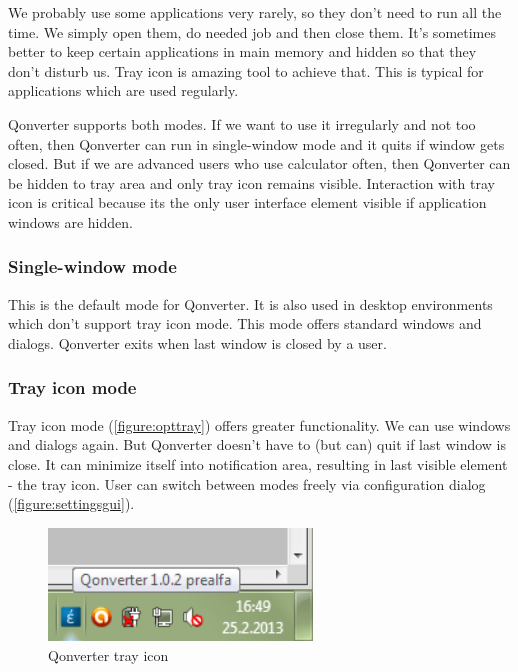 We probably use some applications very rarely, so they don't need to run all the time. We simply open them, do needed job and then close them. It's sometimes better to keep certain applications in main memory and hidden so that they don't disturb us. Tray icon is amazing tool to achieve that. This is typical for applications which are used regularly.

Qonverter supports both modes. If we want to use it irregularly and not too often, then Qonverter can run in single-window mode and it quits if window gets closed. But if we are advanced users who use calculator often, then Qonverter can be hidden to tray area and only tray icon remains visible. Interaction with tray icon is critical because its the only user interface element visible if application windows are hidden.

\subsubsection{Single-window mode}
This is the default mode for Qonverter. It is also used in desktop environments which don't support tray icon mode. This mode offers standard windows and dialogs. Qonverter exits when last window is closed by a user.

\subsubsection{Tray icon mode}
Tray icon mode (\autoref{figure:opttray}) offers greater functionality. We can use windows and dialogs again. But Qonverter doesn't have to (but can) quit if last window is close. It can minimize itself into notification area, resulting in last visible element - the tray icon. User can switch between modes freely via configuration dialog (\autoref{figure:settingsgui}).

\begin{figure}[ht]
\begin{center}
\includegraphics[width=7cm]{graphics/real-world/01-tray.png}
\caption{Qonverter tray icon}\label{figure:opttray}
\end{center}
\end{figure}

